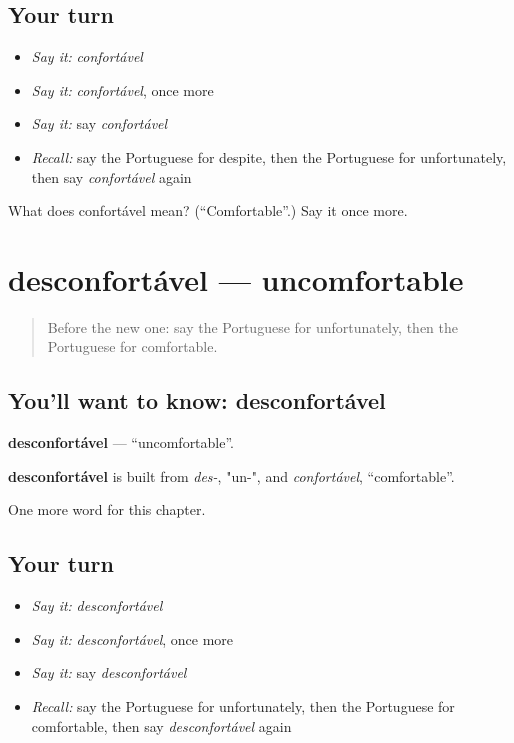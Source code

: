 \subsection*{Your turn}
\begin{itemize}
\raggedright
  \item \emph{Say it:} \emph{confortável}
  \item \emph{Say it:} \emph{confortável}, once more
  \item \emph{Say it:} say \emph{confortável}
  \item \emph{Recall:} say the Portuguese for despite, then the Portuguese for unfortunately, then say \emph{confortável} again
\end{itemize}

\begin{tcolorbox}[breakable,colback=teal!4,colframe=teal!35!black,title={Before you move on}]
What does confortável mean? (\textquotedblleft{}Comfortable\textquotedblright{}.) Say it once more.
\end{tcolorbox}
\section[desconfortável]{desconfortável — uncomfortable}

\label{lesson:PT-C153-desconfortavel}



\begin{quote}
Before the new one: say the Portuguese for unfortunately, then the Portuguese for comfortable.
\end{quote}

\subsection*{You'll want to know: desconfortável}
\textbf{desconfortável} — \textquotedblleft{}uncomfortable\textquotedblright{}.

\begin{cousinweb}
\textbf{desconfortável} is built from \emph{des-}, "un-", and \emph{confortável}, \textquotedblleft{}comfortable\textquotedblright{}.
\end{cousinweb}

\begin{grammarlens}[title={What you've built}]
One more word for this chapter.
\end{grammarlens}

\subsection*{Your turn}
\begin{itemize}
\raggedright
  \item \emph{Say it:} \emph{desconfortável}
  \item \emph{Say it:} \emph{desconfortável}, once more
  \item \emph{Say it:} say \emph{desconfortável}
  \item \emph{Recall:} say the Portuguese for unfortunately, then the Portuguese for comfortable, then say \emph{desconfortável} again
\end{itemize}

